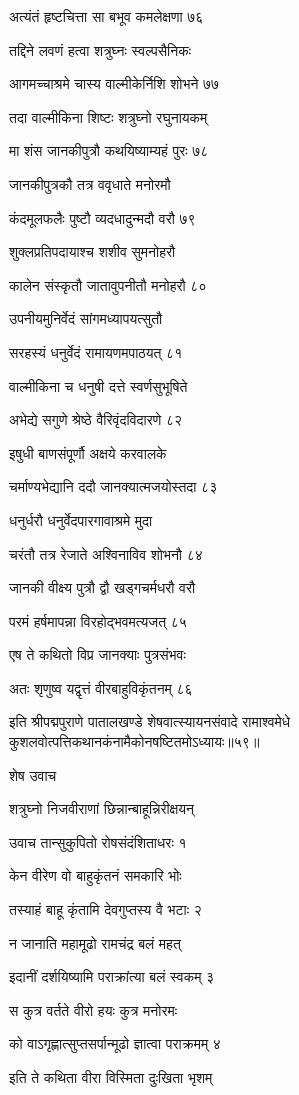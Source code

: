 अत्यंतं हृष्टचित्ता सा बभूव कमलेक्षणा ७६

तद्दिने लवणं हत्वा शत्रुघ्नः स्वल्पसैनिकः

आगमच्चाश्रमे चास्य वाल्मीकेर्निशि शोभने ७७

तदा वाल्मीकिना शिष्टः शत्रुघ्नो रघुनायकम्

मा शंस जानकीपुत्रौ कथयिष्याम्यहं पुरः ७८

जानकीपुत्रकौ तत्र ववृधाते मनोरमौ

कंदमूलफलैः पुष्टौ व्यदधादुन्मदौ वरौ ७९

शुक्लप्रतिपदायाश्च शशीव सुमनोहरौ

कालेन संस्कृतौ जातावुपनीतौ मनोहरौ ८०

उपनीयमुनिर्वेदं सांगमध्यापयत्सुतौ

सरहस्यं धनुर्वेदं रामायणमपाठयत् ८१

वाल्मीकिना च धनुषी दत्ते स्वर्णसुभूषिते

अभेद्ये सगुणे श्रेष्ठे वैरिवृंदविदारणे ८२

इषुधी बाणसंपूर्णौ अक्षये करवालके

चर्माण्यभेद्यानि ददौ जानक्यात्मजयोस्तदा ८३

धनुर्धरौ धनुर्वेदपारगावाश्रमे मुदा

चरंतौ तत्र रेजाते अश्विनाविव शोभनौ ८४

जानकी वीक्ष्य पुत्रौ द्वौ खड्गचर्मधरौ वरौ

परमं हर्षमापन्ना विरहोद्भवमत्यजत् ८५

एष ते कथितो विप्र जानक्याः पुत्रसंभवः

अतः शृणुष्व यद्वृत्तं वीरबाहुविकृंतनम् ८६

इति श्रीपद्मपुराणे पातालखण्डे शेषवात्स्यायनसंवादे रामाश्वमेधे कुशलवोत्पत्तिकथानकंनामैकोनषष्टितमोऽध्यायः॥५९॥


शेष उवाच

शत्रुघ्नो निजवीराणां छिन्नान्बाहून्निरीक्षयन्

उवाच तान्सुकुपितो रोषसंदंशिताधरः १

केन वीरेण वो बाहुकृंतनं समकारि भोः

तस्याहं बाहू कृंतामि देवगुप्तस्य वै भटाः २

न जानाति महामूढो रामचंद्र बलं महत्

इदानीं दर्शयिष्यामि पराक्रांत्या बलं स्वकम् ३

स कुत्र वर्तते वीरो हयः कुत्र मनोरमः

को वाऽगृह्णात्सुप्तसर्पान्मूढो ज्ञात्वा पराक्रमम् ४

इति ते कथिता वीरा विस्मिता दुःखिता भृशम्

